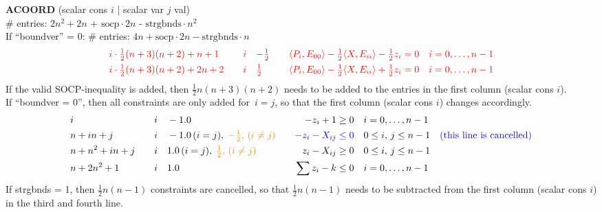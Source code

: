\documentclass[11pt,a4paper]{article}
\theoremstyle{definition}
\begin{document}
{\noindent
\textbf{ACOORD} (scalar cons $i$ | scalar var $j$ val) \\
\# entries: $2n^2+2n$ + {\color{red} $\text{socp}\cdot 2n$} - {\color{blue}
  $\text{strgbnds} \cdot n^2$} \\
{\color{violet} If ``boundver'' = 0: \# entries: $4n +\text{socp}\cdot 2n
  - \text{strgbnds} \cdot n$} \\
\[
  \begin{aligned}
    &{\color{red}i\cdot\tfrac{1}{2}(n+3)(n+2) + n+1} \quad & {\color{red}i} \quad &
    {\color{red}-\tfrac{1}{2}} \quad & {\color{red} \langle P_i, E_{00}
      \rangle - \tfrac{1}{2}\langle X,E_{ii}\rangle - \tfrac{1}{2}z_i = 0}
    \quad &{\color{red} i = 0,\dots,n-1} \\
    &{\color{red}i\cdot\tfrac{1}{2}(n+3)(n+2) + 2n+2} \quad & {\color{red}i} \quad &
    {\color{red}\tfrac{1}{2}} \quad & {\color{red} \langle P_i, E_{00}
      \rangle - \tfrac{1}{2}\langle X,E_{ii}\rangle + \tfrac{1}{2}z_i = 0}
    \quad &{\color{red} i = 0,\dots,n-1} \\
  \end{aligned}
\]
{\color{red} If the valid SOCP-inequality is added, then $\tfrac{1}{2}n(n+3)(n+2)$ needs
  to be added to the entries in the first column (scalar cons $i$).}\\
{\color{violet} If ``boundver = 0'', then all constraints are only added
  for~$i=j$, so that the first column (scalar cons $i$) changes accordingly.}\\
\[
  \begin{aligned}
    &i \quad & i \quad & -1.0 \quad & -z_i + 1 \geq 0 \quad & i = 0, \dots,
    n-1 \\
    &n+in+j \quad & i \quad & -1.0\, (i =
    j),\; {\color{orange} -\tfrac{1}{2},\,(i \neq j)} \quad & {\color{blue}-z_i - X_{ij}
    \leq 0} \quad & 0 \leq i,\, j \leq n-1 \quad {\color{blue}
    (\text{this line is cancelled})} \\
    &n+n^2+in+j \quad & i \quad & 1.0\, (i =
    j),\; {\color{orange} \tfrac{1}{2},\,(i \neq j)}\quad & z_i - X_{ij}
    \geq 0 \quad & 0 \leq i,\, j \leq n-1 \\
    &n+2n^2+1 \quad & i \quad & 1.0 \quad & \sum z_i - k \leq 0 \quad &
    i = 0,\dots,n-1 \\
  \end{aligned}
\]
\noindent
{\color{blue} If strgbnds = 1, then $\tfrac{1}{2}n(n-1)$ constraints are
  cancelled, so that $\tfrac{1}{2}n(n-1)$ needs to be subtracted from the
  first column (scalar cons $i$) in the third and fourth line.\\
}

}
\end{document}
